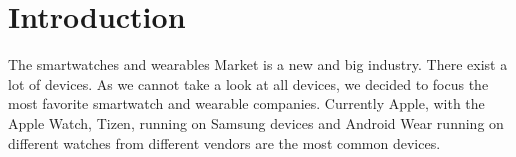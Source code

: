 \section{Introduction}
The smartwatches and wearables Market is a new and big industry. There exist a lot of devices.
As we cannot take a look at all devices, we decided to focus the most favorite smartwatch and wearable companies. 
Currently Apple, with the Apple Watch, Tizen, running on Samsung devices and Android Wear running on different watches from different vendors are the most common devices.
